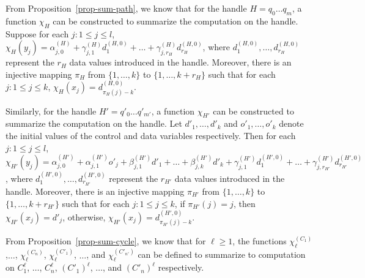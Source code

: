 From Proposition~\ref{prop-sum-path}, we know that 
for the handle $H = q_0 \dots q_m$, a function $\chi_H$ can be constructed to summarize the computation on the handle. Suppose for each $j: 1 \le j \le l$,  $\chi_H(y_j) = \alpha^{(H)}_{j,0} + \gamma^{(H)}_{j,1} d^{(H,0)}_1 + \dots + \gamma^{(H)}_{j,r_H} d^{(H,0)}_{r_H}$, where $d^{(H,0)}_1,\dots, d^{(H,0)}_{r_H}$ represent the $r_H$ data values introduced in the handle. Moreover, there is an injective mapping $\pi_H$ from $\{1,\dots,k\}$ to $\{1,\dots,k+r_H\}$ such that for each $j: 1 \le j \le k$, $\chi_H(x_j) = d^{(H,0)}_{\pi_H(j)-k}$.

Similarly, for the handle $H' = q'_0 \dots q'_{m'}$, a function $\chi_{H'}$ can be constructed to summarize the computation on the handle. Let $d'_1,\dots,d'_k$ and $o'_1,\dots,o'_k$ denote the initial values of the control and data variables respectively. Then for each $j: 1 \le j \le l$,  $\chi_{H'}(y_j) = \alpha^{(H')}_{j,0} + \alpha^{(H')}_{j,1} o'_j + \beta^{(H')}_{j,1} d'_1 + \dots + \beta^{(H')}_{j,k} d'_{k}+ \gamma^{(H')}_{j,1} d^{(H',0)}_1 + \dots + \gamma^{(H')}_{j,r_{H'}} d^{(H',0)}_{r_{H'}}$, where $d^{(H',0)}_1,\dots, d^{(H',0)}_{r_{H'}}$ represent the $r_{H'}$ data values introduced in the handle. Moreover, there is an injective mapping $\pi_{H'}$ from $\{1,\dots,k\}$ to $\{1,\dots,k+r_{H'}\}$ such that for each $j: 1 \le j \le k$, if $\pi_{H'}(j)=j$, then $\chi_{H'}(x_j) = d'_j$, otherwise, $\chi_{H'}(x_j) = d^{(H',0)}_{\pi_{H'}(j)-k}$.

From Proposition~\ref{prop-sum-cycle}, we know that for $\ell \ge 1$, the functions $\chi^{(C_1)}_{\ell}$,$\dots$, $\chi^{(C_n)}_{\ell}$, $\chi^{(C'_1)}_{\ell}$, $\dots$, and $\chi^{(C'_{n'})}_{\ell}$ can be defined to summarize to computation on $C^{\ell}_1$, $\dots$, $C^{\ell}_n$, $(C'_1)^{\ell}$, $\dots$, and $(C'_n)^{\ell}$ respectively. 

